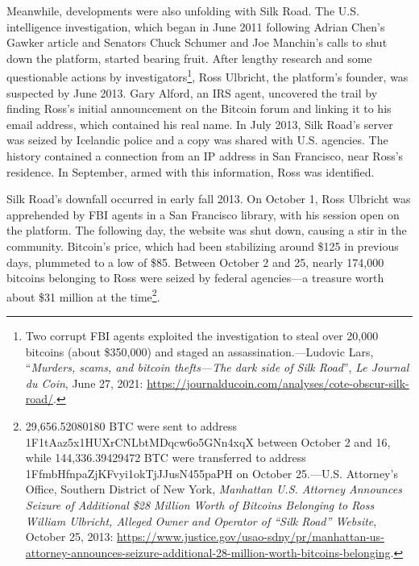 \documentclass[
  a5paper,
  smalldemyvopaper,10pt,twoside,onecolumn,openright,extrafontsizes,hidelinks]{memoir}
\begin{document}
Meanwhile, developments were also unfolding with Silk Road. The U.S.
intelligence investigation, which began in June 2011 following Adrian
Chen's Gawker article and Senators Chuck Schumer and Joe Manchin's calls
to shut down the platform, started bearing fruit. After lengthy research
and some questionable actions by investigators\footnote{Two corrupt FBI
  agents exploited the investigation to steal over 20,000 bitcoins
  (about \$350,000) and staged an assassination.---Ludovic Lars,
  ``\emph{Murders, scams, and bitcoin thefts---The dark side of Silk
  Road}'', \emph{Le Journal du Coin}, June 27, 2021:
  \url{https://journalducoin.com/analyses/cote-obscur-silk-road/}.},
Ross Ulbricht, the platform's founder, was suspected by June 2013. Gary
Alford, an IRS agent, uncovered the trail by finding Ross's initial
announcement on the Bitcoin forum and linking it to his email address,
which contained his real name. In July 2013, Silk Road's server was
seized by Icelandic police and a copy was shared with U.S. agencies. The
history contained a connection from an IP address in San Francisco, near
Ross's residence. In September, armed with this information, Ross was
identified.

Silk Road's downfall occurred in early fall 2013. On October 1, Ross
Ulbricht was apprehended by FBI agents in a San Francisco library, with
his session open on the platform. The following day, the website was
shut down, causing a stir in the community. Bitcoin's price, which had
been stabilizing around \$125 in previous days, plummeted to a low of
\$85. Between October 2 and 25, nearly 174,000 bitcoins belonging to
Ross were seized by federal agencies---a treasure worth about \$31
million at the time\footnote{29,656.52080180 BTC were sent to address
  1F1tAaz5x1HUXrCNLbtMDqcw6o5GNn4xqX between October 2 and 16, while
  144,336.39429472 BTC were transferred to address
  1FfmbHfnpaZjKFvyi1okTjJJusN455paPH on October 25.---U.S. Attorney's
  Office, Southern District of New York, \emph{Manhattan U.S. Attorney
  Announces Seizure of Additional \$28 Million Worth of Bitcoins
  Belonging to Ross William Ulbricht, Alleged Owner and Operator of
  ``Silk Road'' Website}, October 25, 2013:
  \url{https://www.justice.gov/usao-sdny/pr/manhattan-us-attorney-announces-seizure-additional-28-million-worth-bitcoins-belonging}.}.
\end{document}
